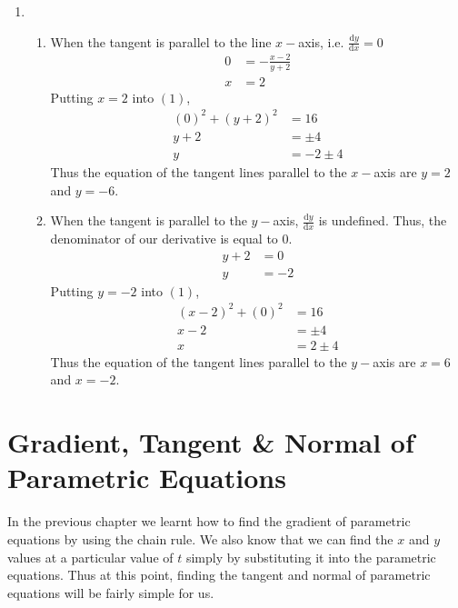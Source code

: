 \documentclass[11pt,a4paper]{book}
\begin{document}
\begin{example}
\begin{enumerate}[label=(\alph*)]
\item
\begin{enumerate}[label=(\roman*)]
\item When the tangent is parallel to the line $x-$axis, i.e. ${\displaystyle \frac{\mathrm{d}y}{\mathrm{d}x}=0}$ \begin{align*} 0 & =-\frac{x-2}{y+2}\\ x & =2 \end{align*} Putting $x=2$ into $\left(1\right)$,  \begin{align*} \left(0\right)^{2}+\left(y+2\right)^{2} & =16\\ y+2 & =\pm4\\ y & =-2\pm4 \end{align*} Thus the equation of the tangent lines parallel to the $x-$axis are $y=2$ and $y=-6$.
\item When the tangent is parallel to the $y-$axis, ${\displaystyle \frac{\mathrm{d}y}{\mathrm{d}x}}$ is undefined. Thus, the denominator of our derivative is equal to $0$. \begin{align*} y+2 & =0\\ y & =-2 \end{align*} Putting $y=-2$ into $\left(1\right)$, \begin{align*} \left(x-2\right)^{2}+\left(0\right)^{2} & =16\\ x-2 & =\pm4\\ x & =2\pm4 \end{align*} Thus the equation of the tangent lines parallel to the $y-$axis are $x=6$ and $x=-2$.
\end{enumerate}
\end{enumerate}

\end{example}

\newpage{}

\section{Gradient, Tangent \& Normal of Parametric Equations}

In the previous chapter we learnt how to find the gradient of parametric
equations by using the chain rule. We also know that we can find the
$x$ and $y$ values at a particular value of $t$ simply by substituting
it into the parametric equations. Thus at this point, finding the
tangent and normal of parametric equations will be fairly simple for
us.
\end{document}
